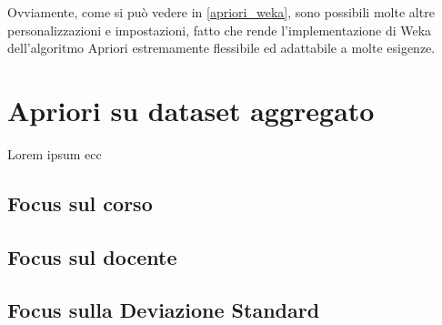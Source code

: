         Ovviamente, come si può vedere in \ref{apriori_weka}, sono possibili molte altre personalizzazioni e impostazioni, fatto che rende l'implementazione di Weka dell'algoritmo Apriori estremamente flessibile ed adattabile a molte esigenze.
 
\section{Apriori su dataset aggregato}

    Lorem ipsum ecc

        \subsection{Focus sul corso}

            

        \subsection{Focus sul docente}

            

        \subsection{Focus sulla Deviazione Standard}

            
